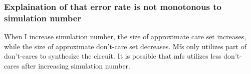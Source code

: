 \documentclass{rpt}
\begin{document}
\subsubsection*{Explaination of that error rate is not monotonous to simulation number}
When I increase simulation number,
the size of approximate care set increases,
while the size of approximate don't-care set decreases.
Mfs only utilizes part of don't-cares to synthesize the circuit.
It is possible that mfs utilizes less don't-cares after increasing simulation number.
\end{document}
